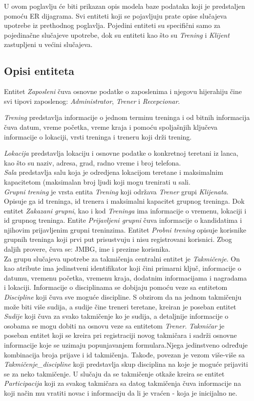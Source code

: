 \documentclass[../main.tex]{subfiles}
\begin{document}
U ovom poglavlju će biti prikazan opis modela baze podataka koji je predstaljen pomoću ER dijagrama. Svi entiteti koji se pojavljuju prate opise slučajeva upotrebe iz prethodnog poglavlja. Pojedini entiteti su specifični samo za pojedinačne slučajeve upotrebe, dok su entiteti kao što su \textit{Trening} i \textit{Klijent} zastupljeni u većini slučajeva. 

\subsection{Opisi entiteta}

Entitet \textit{Zaposleni} čuva osnovne podatke o zaposlenima i njegovu hijerahiju čine svi tipovi zaposlenog: \textit{Administrator}, \textit{Trener} i \textit{Recepcionar}. 

\textit{Trening} predstavlja informacije o jednom terminu treninga i od bitnih informacija čuva datum, vreme početka, vreme kraja i pomoću spoljašnjih ključeva informacije o lokaciji, vrsti treninga i treneru koji drži trening. 

\textit{Lokacija} predstavlja lokaciju i osnovne podatke o konkretnoj teretani iz lanca, kao što su naziv, adresa, grad, radno vreme i broj telefona. 
\\
\textit{Sala} predstavlja salu koja je odredjena lokacijom teretane i maksimalnim kapacitetom (maksimalan broj ljudi koji mogu trenirati u sali.
\\
\textit{Grupni trening} je vrsta entita \textit{Trening} koji održava \textit{Trener} grupi \textit{Klijenata}. Opisuje ga id treninga, id trenera i maksimalni kapacitet grupnog treninga. Dok entitet \textit{Zakazani grupni}, kao i kod \textit{Treninga} ima informacije o vremenu, lokaciji i id grupnog treninga.
Entite \textit{Prijavljeni grupni} čuva informacije o kandidatima i njihovim prijavljenim grupni treninzima.
Entitet \textit{Probni trening} opisuje korisnike grupnih treninga koji prvi put prisustvuju i nisu registrovani korisnici. Zbog daljih provere, čuva se: JMBG, ime i prezime korisnika.
\\
Za grupu slučajeva upotrebe za takmičenja centralni entitet je \textit{Takmičenje}. On kao atribute ima jedinstveni identifikator koji čini primarni ključ, informacije o datumu, vremenu početka, vremenu kraja, dodatnim informacijama i nagradama i lokaciji. Informacije o disciplinama se dobijaju pomoću veze sa entitetom \textit{Discipline} koji čuva sve moguće discipline. S obzirom da na jednom takmičenju može biti više sudija, a sudije čine treneri teretane, kreiran je poseban entitet \textit{Sudije} koji čuva za svako takmičenje ko je sudija, a detaljnije informacije o osobama se mogu dobiti na osnovu veze sa entitetom \textit{Trener}. \textit{Takmičar} je poseban entitet koji se kreira pri registraciji novog takmičara i sadrži osnovne informacije koje se uzimaju popunjavanjem formulara.Njega jedinstveno određuje kombinacija broja prijave i id takmičenja. Takođe, povezan je vezom više-više sa \textit{Takmičenje\_discipline} koji predstavlja skup disciplina na koje je moguće prijaviti se za neko takmičenje. U slučaju da se takmičenje otkaže kreira se entitet \textit{Participacija} koji za svakog takmičara sa datog takmičenja čuva informacije na koji način mu vratiti novac i informaciju da li je vraćen - koja je inicijalno ne. 
\end{document}
